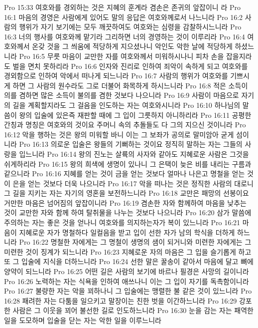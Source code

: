 Pro 15:33  여호와를 경외하는 것은 지혜의 훈계라 겸손은 존귀의 앞잡이니 라
Pro 16:1  마음의 경영은 사람에게 있어도 말의 응답은 여호와께로서 나느니라
Pro 16:2  사람의 행위가 자기 보기에는 모두 깨끗하여도 여호와는 심령을 감찰하시느니라
Pro 16:3  너의 행사를 여호와께 맡기라 그리하면 너의 경영하는 것이 이루리라
Pro 16:4  여호와께서 온갖 것을 그 씌움에 적당하게 지으셨나니 악인도 악한 날에 적당하게 하셨느니라
Pro 16:5  무릇 마음이 교만한 자를 여호와께서 미워하시나니 피차 손을 잡을지라도 벌을 면치 못하리라
Pro 16:6  인자와 진리로 인하여 죄악이 속하게 되고 여호와를 경외함으로 인하여 악에서 떠나게 되느니라
Pro 16:7  사람의 행위가 여호와를 기쁘시게 하면 그 사람의 원수라도 그로 더불어 화목하게 하시느니라
Pro 16:8  적은 소득이 의를 겸하면 많은 소득이 불의를 겸한 것보다 나으니라
Pro 16:9  사람이 마음으로 자기의 길을 계획할지라도 그 걸음을 인도하는 자는 여호와시니라
Pro 16:10  하나님의 말씀이 왕의 입술에 있은즉 재판할 때에 그 입이 그릇하지 아니하리라
Pro 16:11  공평한 간칭과 명칭은 여호와의 것이요 주머니 속의 추돌들도 다 그의 지으신 것이니라
Pro 16:12  악을 행하는 것은 왕의 미워할 바니 이는 그 보좌가 공의로 말미암아 굳게 섬이니라
Pro 16:13  의로운 입술은 왕들의 기뻐하는 것이요 정직히 말하는 자는 그들의 사랑을 입느니라
Pro 16:14  왕의 진노는 살륙의 사자와 같아도 지혜로운 사람은 그것을 쉬게하리라
Pro 16:15  왕의 희색에 생명이 있나니 그 은택이 늦은 비를 내리는 구름과 같으니라
Pro 16:16  지혜를 얻는 것이 금을 얻는 것보다 얼마나 나은고 명철을 얻는 것이 은을 얻는 것보다 더욱 나으니라
Pro 16:17  악을 떠나는 것은 정직한 사람의 대로니 그 길을 지키는 자는 자기의 영혼을 보전하느니라
Pro 16:18  교만은 패망의 선봉이요 거만한 마음은 넘어짐의 앞잡이니라
Pro 16:19  겸손한 자와 함께하여 마음을 낮추는 것이 교만한 자와 함께 하여 탈취물을 나누는 것보다 나으니라
Pro 16:20  삼가 말씀에 주의하는 자는 좋은 것을 얻나니 여호와를 의지하는자가 복이 있느니라
Pro 16:21  마음이 지혜로운 자가 명철하다 일컬음을 받고 입이 선한 자가 남의 학식을 더하게 하느니라
Pro 16:22  명철한 자에게는 그 명철이 생명의 샘이 되거니와 미련한 자에게는 그 미련한 것이 징계가 되느니라
Pro 16:23  지혜로운 자의 마음은 그 입을 슬기롭게 하고 또 그 입술에 지식을 더하느니라
Pro 16:24  선한 말은 꿀송이 같아서 마음에 달고 뼈에 양약이 되느니라
Pro 16:25  어떤 길은 사람의 보기에 바르나 필경은 사망의 길이니라
Pro 16:26  노력하는 자는 식욕을 인하여 애쓰나니 이는 그 입이 자기를 독촉함이니라
Pro 16:27  불량한 자는 악을 꾀하나니 그 입술에는 맹렬한 불 같은 것이 있느니라
Pro 16:28  패려한 자는 다툼을 일으키고 말장이는 친한 벗을 이간하느니라
Pro 16:29  강포한 사람은 그 이웃을 꾀어 불선한 길로 인도하느니라
Pro 16:30  눈을 감는 자는 패역한 일을 도모하며 입술을 닫는 자는 악한 일을 이루느니라
